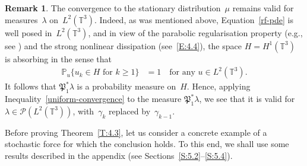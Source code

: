 \documentclass[11pt]{article}
\newcommand{\eg}{e.g.,\xspace}
\theoremstyle{plain}
\theoremstyle{definition}
\newtheorem{remark}[theorem]{Remark}
\let\mathcal\mathscr
\theoremstyle{plain}
\numberwithin{equation}{section}
\newcommand{\IP}{{\mathbb P}}
\newcommand{\T}{{\mathbb T}}
\newcommand{\PP}{{\mathcal P}}
\newcommand{\PPPP}{{\mathfrak P}}
\begin{document}
\begin{remark}
The convergence to the stationary distribution~$\mu$ remains valid for measures~$\lambda$ on~$L^2(\T^3)$. Indeed, as was mentioned above, Equation~\eqref{rf-pde} is well posed in~$L^2(\T^3)$, and in view of the parabolic regularisation property (\eg see \cite[Chap.\,1,\,\S5]{BV1992}) and the strong nonlinear dissipation (see~\eqref{E:4.4}), the space $H=H^1(\T^3)$ is absorbing in the sense that
\begin{align}
\IP_u\{u_k\in H\text{ for $k\ge1$}\}&=1 \quad\text{for any $u\in L^2(\T^3)$}.
\label{absorption}
\end{align}
It follows that $\PPPP_1^*\lambda$ is a probability measure on~$H$. Hence, applying Inequality~\eqref{uniform-convergence} to the measure $\PPPP_1^*\lambda$, we see that it is valid for $\lambda\in\PP(L^2(\T^3))$, with~$\gamma_k$ replaced by~$\gamma_{k-1}$.
\end{remark}

Before proving Theorem~\ref{T:4.3}, let us consider a concrete example of a stochastic force for which the conclusion holds. To this end, we shall use some results described in the appendix (see Sections~\ref{S:5.2}--\ref{S:5.4}).
\end{document}
